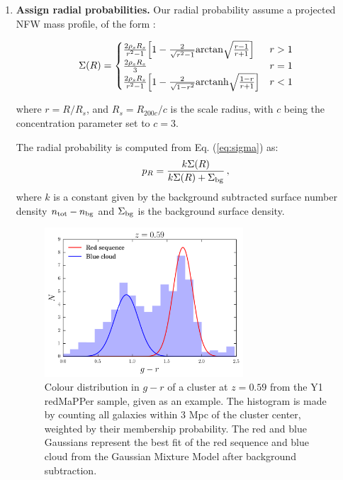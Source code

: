 \begin{enumerate}
\item {\bf Assign radial probabilities.} Our radial probability assume a projected NFW mass profile, of the form \citep{Wright2000GRAVITATIONALHALOS}:

\begin{equation}
\Sigma (R) = \begin{cases}
\frac{2\rho_s R_s}{r^2-1} \Big[1-\frac{2}{\sqrt{r^2-1}}{\rm arctan} \sqrt{\frac{r-1}{r+1}} \Big] & r>1 \\
\frac{2\rho_s R_s}{3} & r=1 \\
\frac{2\rho_s R_s}{r^2-1} \Big[1-\frac{2}{\sqrt{1-r^2}}{\rm arctanh} \sqrt{\frac{1-r}{r+1}} \Big] & r<1 \\
\end{cases}\label{eq:sigma}
\end{equation}

where $r=R/R_s$, and $R_s=R_{200c}/c$ is the scale radius, with $c$ being the concentration parameter set to $c=3$. %

The radial probability is computed from Eq. (\ref{eq:sigma}) as:
\begin{equation}
p_R=\frac{k \Sigma (R)}{k \Sigma (R) + \Sigma_{\rm bg}} \, ,
\end{equation}
 where $k$ is a constant given by the background subtracted surface number density $n_{\rm tot}-n_{\rm bg}$ and $\Sigma_{\rm bg}$ is the background surface density.

\begin{figure}\centering\includegraphics[width=0.7\textwidth]{./chapters/chapter5/figs/cl_test.png}
\caption{Colour distribution in $g-r$ of a cluster at $z=0.59$ from the Y1 redMaPPer sample, given as an example. The histogram is made by counting all galaxies within 3 Mpc of the cluster center, weighted by their membership probability. The red and blue Gaussians represent the best fit of the red sequence and blue cloud from the Gaussian Mixture Model after background subtraction.}\label{fig:histcl}\end{figure}


\end{enumerate}
